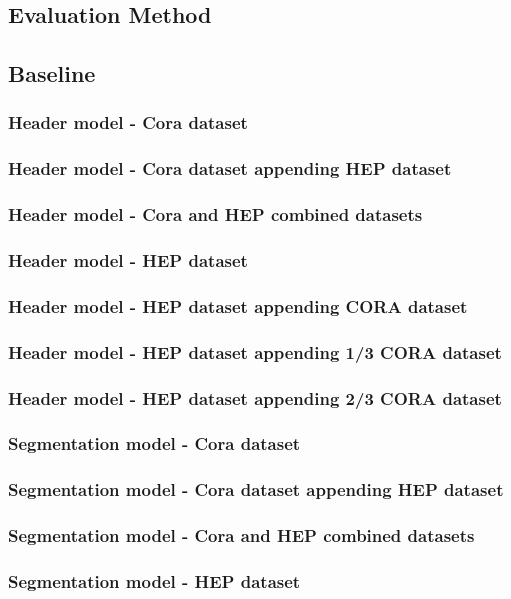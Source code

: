 \documentclass[10pt, oneside]{scrartcl}   	%
\begin{document}
\subsection{Evaluation Method}
\subsection{Baseline}
\subsubsection{Header model - Cora dataset}
\subsubsection{Header model - Cora dataset appending HEP dataset}
\subsubsection{Header model - Cora and HEP combined datasets}
\subsubsection{Header model - HEP dataset}
\subsubsection{Header model - HEP dataset appending CORA dataset}
\subsubsection{Header model - HEP dataset appending 1/3 CORA dataset}
\subsubsection{Header model - HEP dataset appending 2/3 CORA dataset}
\subsubsection{Segmentation model - Cora dataset}
\subsubsection{Segmentation model - Cora dataset appending HEP dataset}
\subsubsection{Segmentation model - Cora and HEP combined datasets}
\subsubsection{Segmentation model - HEP dataset}
\end{document}
